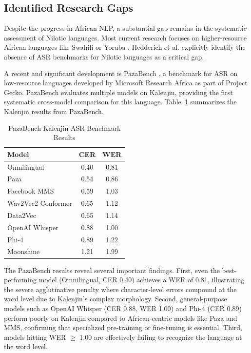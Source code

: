 \documentclass[conference]{IEEEtran}
\begin{document}
\subsection{Identified Research Gaps}

Despite the progress in African NLP, a substantial gap remains in the systematic assessment of Nilotic languages. Most current research focuses on higher-resource African languages like Swahili or Yoruba \cite{b38, b31}. Hedderich et al. \cite{b25} explicitly identify the absence of ASR benchmarks for Nilotic languages as a critical gap.

A recent and significant development is PazaBench \cite{b42}, a benchmark for ASR on low-resource languages developed by Microsoft Research Africa as part of Project Gecko. PazaBench evaluates multiple models on Kalenjin, providing the first systematic cross-model comparison for this language. Table~\ref{tab:pazabench} summarizes the Kalenjin results from PazaBench.

\begin{table}[!t]
\caption{PazaBench Kalenjin ASR Benchmark Results \cite{b42}}
\label{tab:pazabench}
\centering
\small
\begin{tabular}{|l|c|c|}
\hline
\textbf{Model} & \textbf{CER} & \textbf{WER} \\
\hline
Omnilingual & 0.40 & 0.81 \\
\hline
Paza & 0.54 & 0.86 \\
\hline
Facebook MMS & 0.59 & 1.03 \\
\hline
Wav2Vec2-Conformer & 0.65 & 1.12 \\
\hline
Data2Vec & 0.65 & 1.14 \\
\hline
OpenAI Whisper & 0.88 & 1.00 \\
\hline
Phi-4 & 0.89 & 1.22 \\
\hline
Moonshine & 1.21 & 1.99 \\
\hline
\end{tabular}
\end{table}

The PazaBench results reveal several important findings. First, even the best-performing model (Omnilingual, CER 0.40) achieves a WER of 0.81, illustrating the severe agglutinative penalty where character-level errors compound at the word level due to Kalenjin's complex morphology. Second, general-purpose models such as OpenAI Whisper (CER 0.88, WER 1.00) and Phi-4 (CER 0.89) perform poorly on Kalenjin compared to African-centric models like Paza and MMS, confirming that specialized pre-training or fine-tuning is essential. Third, models hitting WER $\geq$ 1.00 are effectively failing to recognize the language at the word level.
\end{document}
